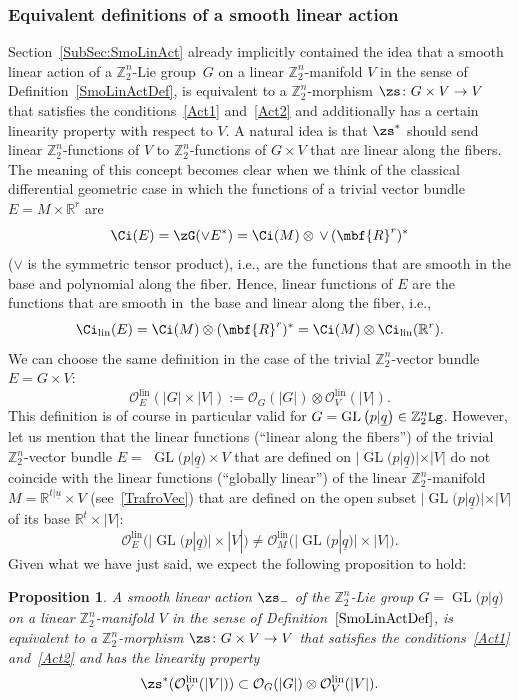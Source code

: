 \documentclass[pdftex]{sigma}%
\newcommand{\op}[1]{\operatorname{#1}}
\newcommand{\R}{{\mathbb R}}
\newcommand{\Z}{{\mathbb Z}}
\def\ul{\underline}
\def\cO{\mathcal{O}}
\def\ul{\underline}
\newcommand{\0}{\otimes}
\newcommand{\z}{\Z_2^n}
\numberwithin{equation}{section}
\newtheorem{Proposition}[Theorem]{Proposition}
 { \theoremstyle{definition}
\newtheorem{Definition}[Theorem]{Definition}
\newtheorem{Example}[Theorem]{Example}
\newtheorem{Remark}[Theorem]{Remark} }
\begin{document}
\subsubsection{Equivalent definitions of a smooth linear action}
Section~\ref{SubSec:SmoLinAct} already implicitly contained the idea that a smooth linear action of a $\z$-Lie group~$G$ on a linear $\z$-manifold $V$ in the sense of Definition~\ref{SmoLinActDef}, is equivalent to a $\z$-morphism $\zs\colon G\times V\to V$ that satisfies the conditions~\eqref{Act1} and~\eqref{Act2} and additionally has a certain linearity property with respect to $V$. A natural idea is that $\zs^*$ should send linear $\z$-functions of $V$ to $\z$-functions of $G\times V$ that are linear along the fibers. The meaning of this concept becomes clear when we think of the classical differential geometric case in which the functions of a trivial vector bundle $E=M\times\R^r$ are
\[
\Ci(E)=\zG(\vee E^*)=\Ci(M)\otimes\,\vee\,(\mbf{R}^r)^*
\]
($\vee$ is the symmetric tensor product), i.e., are the functions that are smooth in the base and polynomial along the fiber. Hence, linear functions of $E$ are the functions that are smooth in~the base and linear along the fiber, i.e.,
\[
\Ci_{\op{lin}}(E)=\Ci(M)\otimes(\mbf{R}^r)^*=\Ci(M)\otimes\Ci_{\op{lin}}(\R^r).
\]
We can choose the same definition in the case of the trivial $\z$-vector bundle $E=G\times V$:
\[
\cO^{\op{lin}}_{E}(|G|\times|V|):=\cO_G(|G|)\otimes\cO^{\op{lin}}_V(|V|).
\]
This definition is of course in particular valid for $G=\op{GL}\big(p|\ul q\big)\in\z{\tt Lg}$. However, let us mention that the linear functions (``linear along the fibers'') of the trivial $\z$-vector bundle $E=$ \mbox{$\op{GL}\big(p|\ul q\big)\times V$} that are defined on $|\op{GL}\big(p|\ul q\big)|\times|V|$ do not coincide with the linear functions (``globally linear'') of the linear $\z$-manifold $M=\R^{t|\ul u}\times V$ (see~\eqref{TrafroVec}) that are defined on the open subset $|\op{GL}\big(p|\ul q\big)|\times |V|$ of its base $\R^t\times|V|$:
\[
\cO^{\op{lin}}_E\big(\big|\op{GL}\big(p|\ul q\big)\big|\times|V|\big)\neq \cO_M^{\op{lin}}\big(\big|\op{GL}\big(p|\ul q\big)\big|\times |V|\big).
\]
Given what we have just said, we expect the following proposition to hold:

\begin{Proposition}\label{EquivSmoLinActFunPtsMan} A smooth linear action $\zs_-$ of the $\z$-Lie group $G=\op{GL}\big(p|\ul q\big)$ on a linear $\z$-manifold $V$ in the sense of Definition~$\ref{SmoLinActDef}$, is equivalent to a $\z$-morphism $\zs\colon G\times V\to V$ that satisfies the conditions~\eqref{Act1} and~\eqref{Act2} and has the linearity property
\begin{gather}\label{LinCondActZMan}
\zs^*(\cO_V^{\op{lin}}(|V|))\subset \cO_{G}(|G|)\otimes\cO_V^{\op{lin}}(|V|).
\end{gather}
\end{Proposition}
\end{document}
